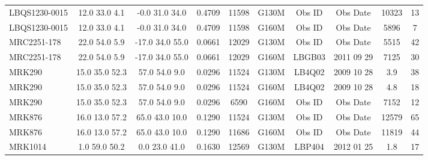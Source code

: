 \documentclass[iop]{emulateapj-rtx4}
\begin{document}
\begin{table}[ht]
\begin{center}
\begin{tabular}{l c c c c c c c c c}
LBQS1230-0015  &           12.0  33.0  4.1  &    -0.0  31.0  34.0  &    0.4709  & 11598  &   G130M  &   Obs ID  & Obs Date  & 10323  &      13         \\
LBQS1230-0015  &           12.0  33.0  4.1  &    -0.0  31.0  34.0  &    0.4709  & 11598  &   G160M  &   Obs ID  & Obs Date  & 5896  &       7          \\
MRC2251-178  &             22.0  54.0  5.9  &    -17.0  34.0  55.0  &   0.0661  & 12029  &   G130M  &   Obs ID  & Obs Date  & 5515  &       42         \\
MRC2251-178  &             22.0  54.0  5.9  &    -17.0  34.0  55.0  &   0.0661  & 12029  &   G160M  &   LBGB03   & 2011 09 29  & 7125  &       30         \\

MRK290  &                  15.0  35.0  52.3  &   57.0  54.0  9.0  &     0.0296  & 11524  &   G130M  &   LB4Q02   & 2009 10 28  &   3.9  &       38         \\
MRK290  &                  15.0  35.0  52.3  &   57.0  54.0  9.0  &     0.0296  & 11524  &   G160M  &   LB4Q02   & 2009 10 28  &   4.8  &       18         \\

MRK290  &                  15.0  35.0  52.3  &   57.0  54.0  9.0  &     0.0296  &  6590  &    G160M  &   Obs ID  & Obs Date  & 7152  &       12         \\
MRK876  &                  16.0  13.0  57.2  &   65.0  43.0  10.0  &    0.1290  & 11524  &   G130M  &   Obs ID  & Obs Date  & 12579  &      65         \\
MRK876  &                  16.0  13.0  57.2  &   65.0  43.0  10.0  &    0.1290  & 11686  &   G160M  &   Obs ID  & Obs Date  & 11819  &      44         \\
MRK1014  &                 1.0  59.0  50.2  &    0.0  23.0  41.0  &     0.1630  & 12569  &   G130M  &   LBP404   & 2012 01 25  &    1.8 &       17         \\


\end{tabular}
\end{center}
\end{table}
\end{document}
